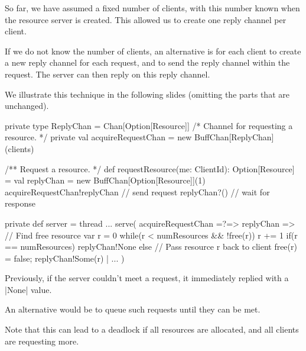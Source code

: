 
\begin{slide}

So far, we have assumed a fixed number of clients, with this number known when
the resource server is created.  This allowed us to create one reply channel
per client.

If we do not know the number of clients, an alternative is for each client to
create a new reply channel for each request, and to send the reply channel
within the request.  The server can then reply on this reply channel.  

We illustrate this technique in the following slides (omitting the parts that
are unchanged). 
\end{slide}


\begin{slide}

\begin{scala}
  private type ReplyChan = Chan[Option[Resource]]
  /* Channel for requesting a resource. */
  private val acquireRequestChan = new BuffChan[ReplyChan](clients)

  /** Request a resource. */
  def requestResource(me: ClientId): Option[Resource] = {
    val replyChan = new BuffChan[Option[Resource]](1)
    acquireRequestChan!replyChan  // send request
    replyChan?() // wait for response
  }
\end{scala}
\end{slide}


\begin{slide}

\begin{scala}
  private def server = thread{
    ...
    serve(
      acquireRequestChan =?=> { replyChan => 
	// Find free resource
	var r = 0
	while(r < numResources && !free(r)) r += 1
	if(r == numResources) replyChan!None
        else{  // Pass resource r back to client 
	  free(r) = false; replyChan!Some(r)
        }
      }
      | ...
    )
  }
\end{scala}
\end{slide}


\begin{slide}

Previously, if the server couldn't meet a request, it immediately replied with
a |None| value.  

An alternative would be to queue such requests until they can be met.

Note that this can lead to a deadlock if all resources are allocated, and all
clients are requesting more.
\end{slide}

